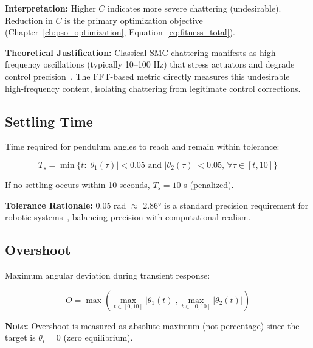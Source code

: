 \textbf{Interpretation:} Higher $C$ indicates more severe chattering (undesirable). Reduction in $C$ is the primary optimization objective (Chapter~\ref{ch:pso_optimization}, Equation~\ref{eq:fitness_total}).

\textbf{Theoretical Justification:} Classical SMC chattering manifests as high-frequency oscillations (typically 10--100 Hz) that stress actuators and degrade control precision~\cite{young1999survey}. The FFT-based metric directly measures this undesirable high-frequency content, isolating chattering from legitimate control corrections.

\subsection{Settling Time}
\label{subsec:settling_time_metric}

Time required for pendulum angles to reach and remain within tolerance:

\begin{equation}
\label{eq:settling_time_formula}
T_s = \min\{t : |\theta_1(\tau)| < 0.05 \text{ and } |\theta_2(\tau)| < 0.05, \, \forall \tau \in [t, 10]\}
\end{equation}

If no settling occurs within 10 seconds, $T_s = 10$ s (penalized).

\textbf{Tolerance Rationale:} 0.05 rad $\approx$ 2.86° is a standard precision requirement for robotic systems~\cite{spong2006robot}, balancing precision with computational realism.

\subsection{Overshoot}
\label{subsec:overshoot_metric}

Maximum angular deviation during transient response:

\begin{equation}
\label{eq:overshoot_formula}
O = \max\left(\max_{t \in [0, 10]} |\theta_1(t)|, \max_{t \in [0, 10]} |\theta_2(t)|\right)
\end{equation}

\textbf{Note:} Overshoot is measured as absolute maximum (not percentage) since the target is $\theta_i = 0$ (zero equilibrium).

